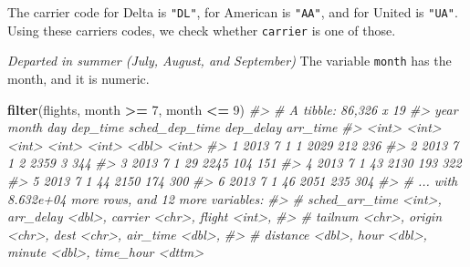\documentclass[]{book}
\newenvironment{Shaded}{\begin{snugshade}}{\end{snugshade}}
\newcommand{\CommentTok}[1]{\textcolor[rgb]{0.56,0.35,0.01}{\textit{#1}}}
\newcommand{\DecValTok}[1]{\textcolor[rgb]{0.00,0.00,0.81}{#1}}
\newcommand{\KeywordTok}[1]{\textcolor[rgb]{0.13,0.29,0.53}{\textbf{#1}}}
\newcommand{\NormalTok}[1]{#1}
\newcommand{\OperatorTok}[1]{\textcolor[rgb]{0.81,0.36,0.00}{\textbf{#1}}}
\newcommand{\StringTok}[1]{\textcolor[rgb]{0.31,0.60,0.02}{#1}}
\theoremstyle{plain}
\theoremstyle{remark}
\theoremstyle{definition}
\theoremstyle{definition}
\theoremstyle{definition}
\theoremstyle{remark}
\begin{document}
The carrier code for Delta is \texttt{"DL"}, for American is
\texttt{"AA"}, and for United is \texttt{"UA"}. Using these carriers
codes, we check whether \texttt{carrier} is one of those.

\begin{Shaded}
\end{Shaded}

\emph{Departed in summer (July, August, and September)} The variable
\texttt{month} has the month, and it is numeric.

\begin{Shaded}
\begin{Highlighting}[]
\KeywordTok{filter}\NormalTok{(flights, month }\OperatorTok{>=}\StringTok{ }\DecValTok{7}\NormalTok{, month }\OperatorTok{<=}\StringTok{ }\DecValTok{9}\NormalTok{)}
\CommentTok{#> # A tibble: 86,326 x 19}
\CommentTok{#>    year month   day dep_time sched_dep_time dep_delay arr_time}
\CommentTok{#>   <int> <int> <int>    <int>          <int>     <dbl>    <int>}
\CommentTok{#> 1  2013     7     1        1           2029       212      236}
\CommentTok{#> 2  2013     7     1        2           2359         3      344}
\CommentTok{#> 3  2013     7     1       29           2245       104      151}
\CommentTok{#> 4  2013     7     1       43           2130       193      322}
\CommentTok{#> 5  2013     7     1       44           2150       174      300}
\CommentTok{#> 6  2013     7     1       46           2051       235      304}
\CommentTok{#> # ... with 8.632e+04 more rows, and 12 more variables:}
\CommentTok{#> #   sched_arr_time <int>, arr_delay <dbl>, carrier <chr>, flight <int>,}
\CommentTok{#> #   tailnum <chr>, origin <chr>, dest <chr>, air_time <dbl>,}
\CommentTok{#> #   distance <dbl>, hour <dbl>, minute <dbl>, time_hour <dttm>}
\end{Highlighting}
\end{Shaded}
\end{document}
